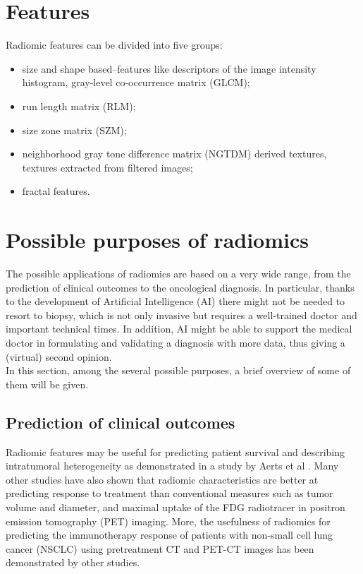 \documentclass[12pt,a4paper]{report}
\begin{document}
\section{Features}

Radiomic features can be divided into five groups\cite{wiki:Radiomics, tesicoppola}:

\begin{itemize}[label=\textbf{*}]
    \item size and shape based–features like descriptors of the image intensity histogram, gray-level co-occurrence matrix (GLCM);
    \item run length matrix (RLM);
    \item size zone matrix (SZM);
    \item neighborhood gray tone difference matrix (NGTDM) derived textures, textures extracted from filtered images;
    \item fractal features.
\end{itemize}

\section{Possible purposes of radiomics}

The possible applications of radiomics are based on a very wide range, from the prediction of clinical outcomes to the oncological diagnosis. In particular, thanks to the development of Artificial Intelligence (AI) there might not be needed to resort to biopsy, which is not only invasive but requires a well-trained doctor and important technical times. In addition, AI might be able to support the medical doctor in formulating and validating a diagnosis with more data, thus giving a (virtual) second opinion\cite{tesicoppola}.\\
In this section, among the several possible purposes, a brief overview of some of them will be given.


\subsection{Prediction of clinical outcomes}

Radiomic features may be useful for predicting patient survival and describing intratumoral heterogeneity as demonstrated in a study by Aerts et al \cite{Aerts}. Many other studies have also shown that radiomic characteristics are better at predicting response to treatment than conventional measures such as tumor volume and diameter, and maximal uptake of the FDG radiotracer in positron emission tomography (PET) imaging. More, the usefulness of radiomics for predicting the immunotherapy response of patients with non-small cell lung cancer (NSCLC) using pretreatment CT and PET-CT images has been demonstrated by other studies\cite{tesicoppola}.
\end{document}
